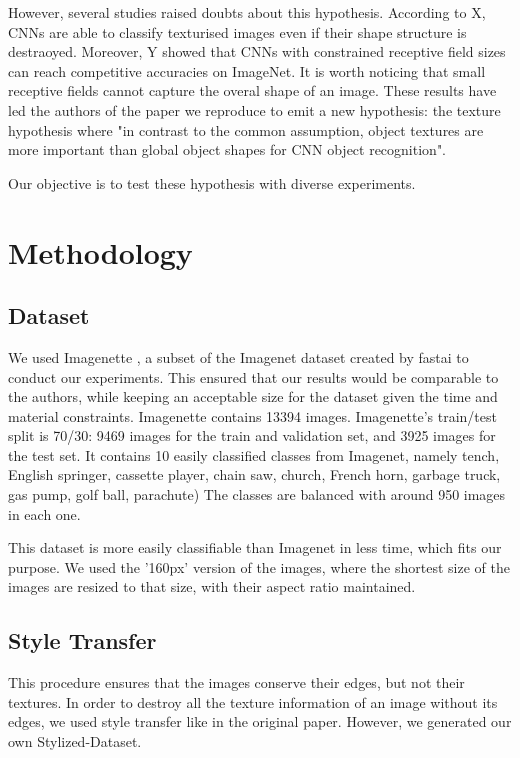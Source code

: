 \documentclass{article}
\begin{document}
However, several studies raised doubts about this hypothesis.
According to X, CNNs are able to classify texturised images even if their shape structure is destraoyed.
Moreover, Y showed that CNNs with constrained receptive field sizes can reach competitive accuracies on ImageNet.
It is worth noticing that small receptive fields cannot capture the overal shape of an image.
These results have led the authors of the paper we reproduce \cite{geirhos2018imagenettrained} 
to emit a new hypothesis: the texture hypothesis where "in contrast to the
common assumption, object textures are more important than global object shapes for CNN object
recognition".

Our objective is to test these hypothesis with diverse experiments.

\section{Methodology}

\subsection{Dataset}

We used Imagenette \cite{fastai2019}, a subset of the Imagenet dataset created 
by fastai to conduct our experiments.
This ensured that our results would be comparable to the authors, 
while keeping an acceptable size for the dataset given the time and material constraints.
Imagenette contains 13394 images.
Imagenette's train/test split is 70/30: 9469 images for the train and validation set, and 3925 images for the test set.
It contains 10 easily classified classes from Imagenet, namely
tench, English springer, cassette player, chain saw, church, French horn, garbage truck, gas pump, golf ball, parachute)
The classes are balanced with around 950 images in each one.

This dataset is more easily classifiable than Imagenet in less time, which fits our purpose.
We used the '160px' version of the images, where the shortest size of the images are resized to that size, 
with their aspect ratio maintained.


\subsection{Style Transfer}

This procedure ensures that the images conserve their edges, but not their textures.
In order to destroy all the texture information of an image without its edges, we used style transfer like in
the original paper.
However, we generated our own Stylized-Dataset. \smallskip
\end{document}
